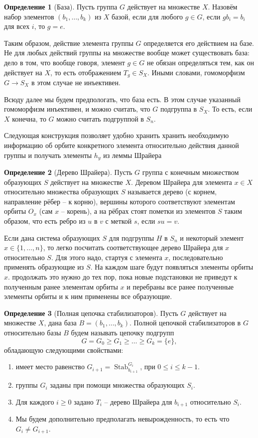 \documentclass[10pt,a4paper,oneside]{book}
\theoremstyle{definition}
\newtheorem*{defn}{\color{yellow!30!red} Определение}
\renewcommand{\leq}{\leqslant}
\renewcommand{\geq}{\geqslant}
\newcommand{\Stab}{\operatorname{Stab}}
\def\dfn{\begin{defn}}
\def\edfn{\end{defn}}
\def\enm{\begin{enumerate}}
\def\eenm{\end{enumerate}}
\begin{document}
\dfn[База] Пусть группа $G$ действует на множестве $X$. Назовём набор элементов $(b_1,\dots,b_k)$ из $X$ базой, если для любого $ g\in G$, если $gb_i=b_i$ для всех $i$, то $g=e$.
\edfn

Таким образом, действие элемента группы $G$ определяется его действием на базе. Не для любых действий группы на множестве вообще может существовать база: дело в том, что вообще говоря, элемент $g\in G$ не обязан определяться тем, как он действует на $X$, то есть отображением $T_g\in S_X$. Иными словами, гомоморфизм $G\to S_X$ в этом случае не инъективен. 

Всюду далее мы будем предпологать, что база есть. В этом случае указанный гомоморфизм инъективен, и можно считать, что $G$ подгруппа в $S_X$. То есть, если $X$ конечна, то $G$ можно считать подгруппой в $S_n$. 

Следующая конструкция позволяет удобно хранить хранить необходимую информацию об орбите конкретного элемента относительно действия данной группы и получать элементы $h_y$ из леммы Шрайера


\dfn[Дерево Шрайера] Пусть $G$ группа с конечным множеством образующих $S$ действует на множестве $X$. Деревом Шрайера для элемента $x\in X$ относительно множества образующих $S$ называется дерево (с корнем, направление рёбер -- к корню), вершины которого соответствуют элементам орбиты $O_x$ (сам $x$ -- корень), а на рёбрах стоят пометки из элементов $S$ таким образом, что есть ребро из $u$ в $v$ с меткой $s$, если $su=v$.
\edfn

Если дана система образующих $S$ для подгруппы $H$ в $S_n$ и некоторый элемент $x\in \{1,\dots,n\}$, то легко посчитать соответствующее дерево Шрайера для $x$ относительно $S$. Для этого надо, стартуя с элемента $x$, последовательно применять образующие из $S$. На каждом шаге будут появляться элементы орбиты $x$. продолжать это нужно до тех пор, пока новые подстановки не приведут к  полученным  ранее элементам орбиты $x$ и перебраны все ранее полученные элементы орбиты и к ним применены все образующие.

\dfn[Полная цепочка стабилизаторов] Пусть $G$ действует на множестве $X$, дана база $B=(b_1,\dots,b_k)$. Полной цепочкой стабилизаторов в $G$ относительно базы $B$ будем называть цепочку подгрупп 
$$G=G_0\geq G_1 \geq \dots \geq G_k=\{e\},$$
обладающую следующими свойствами:
\enm
\item имеет место равенство $G_{i+1}=\Stab_{b_{i+1}}^{G_i}$, при $0\leq i\leq k-1$.
\item группы $G_i$ заданы при помощи множества образующих $S_i$.
\item Для каждого $i\geq 0$ задано $T_i$ -- дерево Шрайера для $b_{i+1}$ относительно $S_i$.
\item Мы будем дополнительно предполагать невырожденность, то есть что $G_i\neq G_{i+1}$.
\eenm
\edfn
\end{document}
